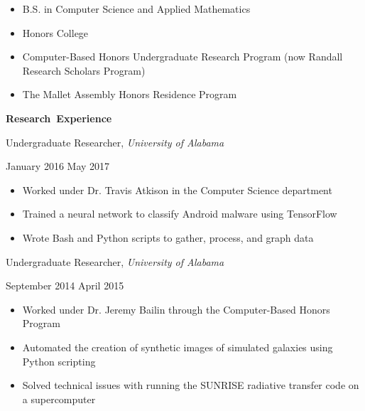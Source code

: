 \documentclass[11pt]{article}
\begin{document}
\begin{itemize}
  \item B.S. in Computer Science and Applied Mathematics
  \item Honors College
  \item Computer-Based Honors Undergraduate Research Program (now Randall Research Scholars Program)
  \item The Mallet Assembly Honors Residence Program
\end{itemize}

\vspace{0.8em}
\hbox{\large \textbf{Research Experience}}

\vspace{0.4em}
\begin{minipage}[t]{0.65\textwidth}
\flushleft
Undergraduate Researcher, \textit{University of Alabama}\\
\end{minipage}
\begin{minipage}[t]{0.30\textwidth}
\flushright
January 2016 \space \textemdash \space May 2017\\
\end{minipage}

\begin{itemize}
  \item Worked under Dr. Travis Atkison in the Computer Science department
  \item Trained a neural network to classify Android malware using TensorFlow
  \item Wrote Bash and Python scripts to gather, process, and graph data
\end{itemize}

\vspace{0.4em}
\begin{minipage}[t]{0.65\textwidth}
\flushleft
Undergraduate Researcher, \textit{University of Alabama}\\
\end{minipage}
\begin{minipage}[t]{0.30\textwidth}
\flushright
September 2014 \space \textemdash \space April 2015\\
\end{minipage}

\begin{itemize}
  \item Worked under Dr. Jeremy Bailin through the Computer-Based Honors Program
  \item Automated the creation of synthetic images of simulated galaxies using Python scripting
  \item Solved technical issues with running the SUNRISE radiative transfer code on a supercomputer
\end{itemize}
\end{document}
